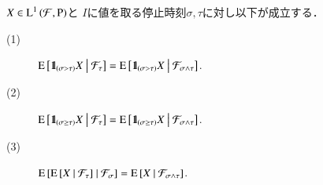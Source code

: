 	\begin{itembox}[l]{}
		\begin{prp}[停止時刻と条件付き期待値]
			$X \in \Lp{1}{\mathcal{F},\operatorname{P}}$と
			$I$に値を取る停止時刻$\sigma, \tau$に対し以下が成立する．
			\begin{description}
				\item[(1)] $\cexp{\defunc_{(\sigma > \tau)} X}{\mathcal{F}_\tau} = \cexp{\defunc_{(\sigma > \tau)} X}{\mathcal{F}_{\sigma \wedge \tau}}$.
				\item[(2)] $\cexp{\defunc_{(\sigma \geq \tau)} X}{\mathcal{F}_\tau} = \cexp{\defunc_{(\sigma \geq \tau)} X}{\mathcal{F}_{\sigma \wedge \tau}}$.
				\item[(3)] $\cexp{\cexp{X}{\mathcal{F}_\tau}}{\mathcal{F}_\sigma} = \cexp{X}{\mathcal{F}_{\sigma \wedge \tau}}$.
			\end{description}
			\label{prp:stopping_time_and_conditional_expectation}
		\end{prp}
	\end{itembox}
	
